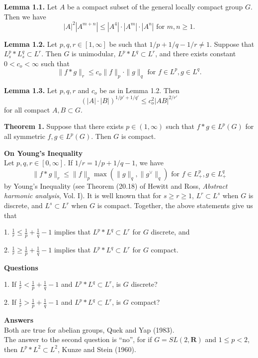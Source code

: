 \documentclass[landscape]{slides}
\begin{document}
\begin{slide}
\textbf{Lemma 1.1.}  Let $A$ be a compact subset of the general locally compact group $G$.  Then we have
$$|A|^2|A^{m+n}| \leq |A^4|\cdot|A^m|\cdot|A^n|\mbox{ for } m,n \geq 1.$$

\textbf{Lemma 1.2.}  Let $p,q,r \in [1,\infty]$ be such that $1/p+1/q-1/r \neq 1$.  Suppose that $L^p_s * L^q_s \subset L^r$.  Then $G$ is unimodular, $L^p * L^q \subset L^r$, and there exists constant $0<c_o<\infty$ such that
$$\|f*g\|_r \leq c_o\|f\|_p\cdot\|g\|_q \mbox{ for } f \in L^p, g \in L^q.$$

\textbf{Lemma 1.3.}  Let $p,q,r$ and $c_o$ be as in Lemma 1.2.  Then
$$(|A|\cdot|B|)^{1/p'+1/q'} \leq c^2_o|AB|^{2/r'}$$
for all compact $A, B \subset G$.

\textbf{Theorem 1.}  Suppose that there exists $p\in(1, \infty)$ such that $f * g \in L^p(G)$ for all symmetric $f,g\in L^p(G)$.  Then $G$ is compact.
\end{slide}

\begin{slide}
\textbf{On Young's Inequality}\\
Let $p,q,r \in [0,\infty]$.  If $1/r=1/p+1/q-1$, we have
$$\|f*g\|_r \leq \|f\|_p\max(\|g\|_q,\|g^{\vee}\|_q)\mbox{ for }f \in L^{p}_{+}, g\in L^q_+$$
by Young's Inequality (see Theorem (20.18) of Hewitt and Ross, \emph{Abstract harmonic analysis}, Vol. I).  It is well known that for $s \geq r \geq 1$, $L^r \subset L^s$ when $G$ is discrete, and $L^s \subset L^r$ when $G$ is compact.  Together, the above statements give us that
\begin{list}{}{\topsep 0pt}
\item[1.] $\frac{1}{r} \leq \frac{1}{p} + \frac{1}{q} -1$ implies that $L^p * L^q \subset L^r$ for $G$ discrete, and
\item[2.] $\frac{1}{r} \geq \frac{1}{p} + \frac{1}{q} -1$ implies that $L^p * L^q \subset L^r$ for $G$ compact.
\end{list}
\end{slide}

\begin{slide}
\textbf{Questions}
\begin{list}{}{\topsep 0pt}
\item[1.]  If $\frac{1}{r} < \frac{1}{p} + \frac{1}{q} -1$ and $L^p * L^q \subset L^r$, is $G$ discrete?
\item[2.]  If $\frac{1}{r} > \frac{1}{p} + \frac{1}{q} -1$ and $L^p * L^q \subset L^r$, is $G$ compact?
\end{list}
\textbf{Answers}\\
Both are true for abelian groups, Quek and Yap (1983).\\
The answer to the second question is ``no'', for if $G = SL(2,\mathbf{R})$ and $1 \leq p < 2$, then $L^p * L^2 \subset L^2$, Kunze and Stein (1960).
\end{slide}
\end{document}
